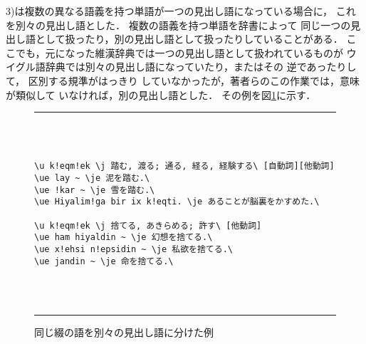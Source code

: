 3)は複数の異なる語義を持つ単語が一つの見出し語になっている場合に，
これを別々の見出し語とした．
複数の語義を持つ単語を辞書によって
同じ一つの見出し語として扱ったり，別の見出し語として扱ったりしていることがある．
ここでも，元になった維漢辞典\cite{UHDIC}では一つの見出し語として扱われているものが
ウイグル語辞典\cite{UJDIC}では別々の見出し語になっていたり，またはその
逆であったりして，
区別する規準がはっきり
していなかったが，著者らのこの作業では，意味が類似して
いなければ，別の見出し語とした．
その例を図\ref{fig:separated_word}に示す．
\begin{figure}[t]
\begin{center}
\rule{0.9\textwidth}{0.2mm} \\ \mbox{} \\
\begin{minipage}{0.9\textwidth}
\small
\begin{verbatim}
\u k!eqm!ek \j 踏む, 渡る; 通る, 経る, 経験する\ [自動詞][他動詞]
\ue lay ~ \je 泥を踏む.\
\ue !kar ~ \je 雪を踏む.\
\ue Hiyalim!ga bir ix k!eqti. \je あることが脳裏をかすめた.\

\u k!eqm!ek \j 捨てる, あきらめる; 許す\ [他動詞]
\ue ham hiyaldin ~ \je 幻想を捨てる.\
\ue x!ehsi n!epsidin ~ \je 私欲を捨てる.\
\ue jandin ~ \je 命を捨てる.\
\end{verbatim}
\end{minipage} \\ \mbox{} \\ \rule{0.9\textwidth}{0.2mm} \vspace{-1.6ex}
\end{center}
\caption{同じ綴の語を別々の見出し語に分けた例}
\label{fig:separated_word} 
\end{figure}

